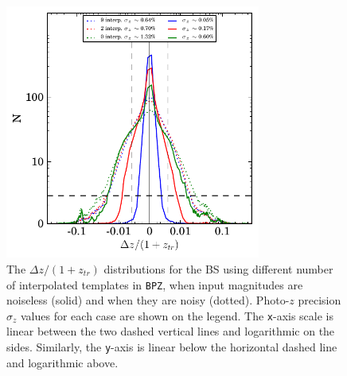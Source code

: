 \begin{figure}
\centering
\includegraphics[width=84mm]{./plots/Dz_pau_bright.pdf}
\caption{The $\Delta z / (1+z_{tr})$ distributions for the BS using different number of interpolated templates in \texttt{BPZ}, when input magnitudes are noiseless (solid) and when they are noisy (dotted). Photo-$z$ precision $\sigma_z$ values for each case are shown on the legend. The \texttt{x}-axis scale is linear between the two dashed vertical lines and logarithmic on the sides. Similarly, the \texttt{y}-axis is linear below the horizontal dashed line and logarithmic above.}
\label{dz_hist_bright}
\end{figure}

